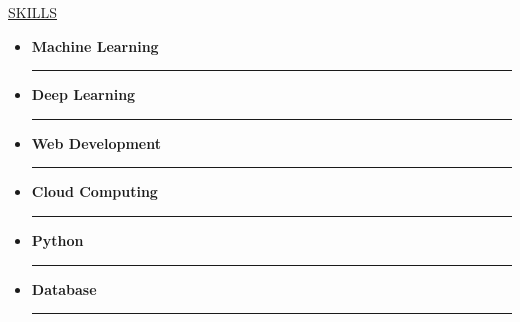 \documentclass[11pt]{article}
\newcommand{\betteruline}[1]{
    \uline{#1}
}
\newcommand{\sectiontitle}[1]{
    \begingroup
        \titlebold
        \betteruline{\Large\uppercase{#1}  }
        \vspace{1.7mm}
    \endgroup
}
\begin{document}
\begin{paracol}{2}
    \sectiontitle{Skills}
\begin{itemize}[left=0pt]
    \item \textbf{Machine Learning} \\
    \begin{minipage}{0.1\linewidth}
        \hspace*{1mm}\rule{4.5cm}{0.2cm} %
    \end{minipage}
    
    \item \textbf{Deep Learning} \\
    \begin{minipage}{0.1\linewidth}
        \hspace*{1mm}\rule{4.5cm}{0.2cm} %
    \end{minipage}
    
    \item \textbf{Web Development} \\
    \begin{minipage}{0.1\linewidth}
        \hspace*{1mm}\rule{3.0cm}{0.2cm} %
    \end{minipage}

        \item \textbf{Cloud Computing} \\
    \begin{minipage}{0.1\linewidth}
        \hspace*{1mm}\rule{4cm}{0.2cm} %
    \end{minipage}

    \item \textbf{Python} \\
    \begin{minipage}{0.1\linewidth}
        \hspace*{1mm}\rule{5cm}{0.2cm} %
    \end{minipage}

    \item \textbf{Database} \\
    \begin{minipage}{0.1\linewidth}
        \hspace*{1mm}\rule{4cm}{0.2cm} %
    \end{minipage}
\end{itemize}


\end{paracol}
\end{document}

